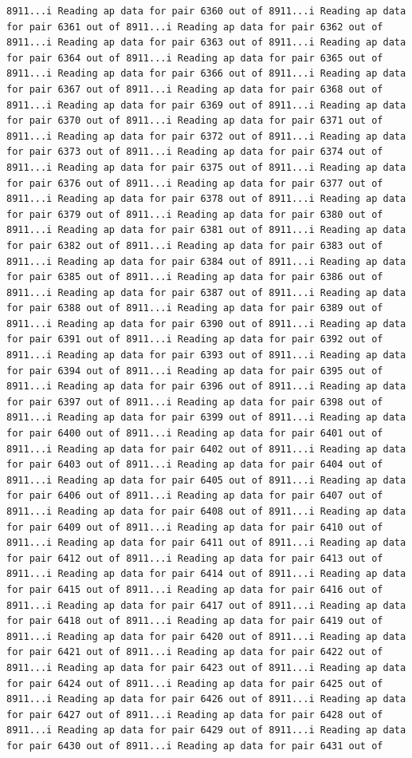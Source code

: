 \documentclass[
]{article}
\begin{document}
\begin{verbatim}
8911...i Reading ap data for pair 6360 out of 8911...i Reading ap data for pair 6361 out of 8911...i Reading ap data for pair 6362 out of 8911...i Reading ap data for pair 6363 out of 8911...i Reading ap data for pair 6364 out of 8911...i Reading ap data for pair 6365 out of 8911...i Reading ap data for pair 6366 out of 8911...i Reading ap data for pair 6367 out of 8911...i Reading ap data for pair 6368 out of 8911...i Reading ap data for pair 6369 out of 8911...i Reading ap data for pair 6370 out of 8911...i Reading ap data for pair 6371 out of 8911...i Reading ap data for pair 6372 out of 8911...i Reading ap data for pair 6373 out of 8911...i Reading ap data for pair 6374 out of 8911...i Reading ap data for pair 6375 out of 8911...i Reading ap data for pair 6376 out of 8911...i Reading ap data for pair 6377 out of 8911...i Reading ap data for pair 6378 out of 8911...i Reading ap data for pair 6379 out of 8911...i Reading ap data for pair 6380 out of 8911...i Reading ap data for pair 6381 out of 8911...i Reading ap data for pair 6382 out of 8911...i Reading ap data for pair 6383 out of 8911...i Reading ap data for pair 6384 out of 8911...i Reading ap data for pair 6385 out of 8911...i Reading ap data for pair 6386 out of 8911...i Reading ap data for pair 6387 out of 8911...i Reading ap data for pair 6388 out of 8911...i Reading ap data for pair 6389 out of 8911...i Reading ap data for pair 6390 out of 8911...i Reading ap data for pair 6391 out of 8911...i Reading ap data for pair 6392 out of 8911...i Reading ap data for pair 6393 out of 8911...i Reading ap data for pair 6394 out of 8911...i Reading ap data for pair 6395 out of 8911...i Reading ap data for pair 6396 out of 8911...i Reading ap data for pair 6397 out of 8911...i Reading ap data for pair 6398 out of 8911...i Reading ap data for pair 6399 out of 8911...i Reading ap data for pair 6400 out of 8911...i Reading ap data for pair 6401 out of 8911...i Reading ap data for pair 6402 out of 8911...i Reading ap data for pair 6403 out of 8911...i Reading ap data for pair 6404 out of 8911...i Reading ap data for pair 6405 out of 8911...i Reading ap data for pair 6406 out of 8911...i Reading ap data for pair 6407 out of 8911...i Reading ap data for pair 6408 out of 8911...i Reading ap data for pair 6409 out of 8911...i Reading ap data for pair 6410 out of 8911...i Reading ap data for pair 6411 out of 8911...i Reading ap data for pair 6412 out of 8911...i Reading ap data for pair 6413 out of 8911...i Reading ap data for pair 6414 out of 8911...i Reading ap data for pair 6415 out of 8911...i Reading ap data for pair 6416 out of 8911...i Reading ap data for pair 6417 out of 8911...i Reading ap data for pair 6418 out of 8911...i Reading ap data for pair 6419 out of 8911...i Reading ap data for pair 6420 out of 8911...i Reading ap data for pair 6421 out of 8911...i Reading ap data for pair 6422 out of 8911...i Reading ap data for pair 6423 out of 8911...i Reading ap data for pair 6424 out of 8911...i Reading ap data for pair 6425 out of 8911...i Reading ap data for pair 6426 out of 8911...i Reading ap data for pair 6427 out of 8911...i Reading ap data for pair 6428 out of 8911...i Reading ap data for pair 6429 out of 8911...i Reading ap data for pair 6430 out of 8911...i Reading ap data for pair 6431 out of 
\end{verbatim}
\end{document}
